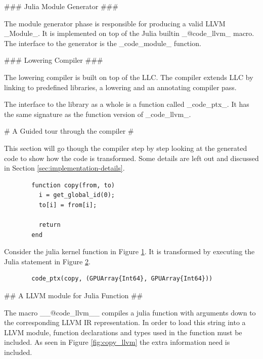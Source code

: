 \begin{markdown}
### Julia Module Generator ###

The module generator phase is responsible for producing a valid LLVM
_Module_. It is implemented on top of the Julia builtin _@code_llvm_
macro. The interface to the generator is the _code_module_ function.

### Lowering Compiler ###

The lowering compiler is built on top of the \gls{LLC}. The compiler
extends \gls{LLC} by linking to predefined libraries, a lowering and
an annotating compiler pass.

The interface to the library as a whole is a function called
_code_ptx_. It has the same signature as the function version of
_code_llvm_.

# A Guided tour through the compiler #

This section will go though the compiler step by step looking at the
generated code to show how the code is transformed. Some details are
left out and discussed in Section \ref{sec:implementation-details}.


\begin{figure}[H]
  \begin{verbatim}
  function copy(from, to)
    i = get_global_id(0);
    to[i] = from[i];
  
    return
  end
  \end{verbatim}
  \caption{}
  \label{fig:julia-copy}
\end{figure}

Consider the julia kernel function in Figure \ref{fig:julia-copy}. It
is transformed by executing the Julia statement in Figure
\ref{fig:impl:code_ptx}.

\begin{figure}[H]
  \begin{verbatim}
  code_ptx(copy, (GPUArray{Int64}, GPUArray{Int64}))
  \end{verbatim}
  \caption{}
  \label{fig:impl:code_ptx}
\end{figure}


## A LLVM module for Julia Function ##

The macro __@code\_llvm__ compiles a julia function with arguments
down to the corresponding LLVM IR representation. In order to load
this string into a LLVM module, function declarations and types used
in the function must be included. As seen in Figure
\ref{fig:copy_llvm} the extra information need is included. 


\end{markdown}
